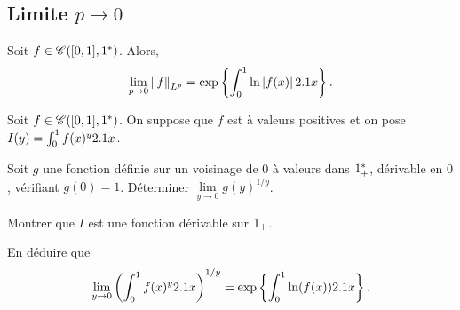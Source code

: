 \begin{solution}
\begin{reponses}
\end{reponses}
\end{solution}

\subsection{Limite $p \to 0$}

\begin{theo}
Soit $f \in \mathscr{C}([0,1],1^*)$. Alors,
\[
\lim_{p\to0} \norm{f}_{L^p} = \exp\left\{\int_0^1 \ln\left| f(x) \right| 2.1 x\right\}.
\]
\end{theo}


\begin{exercice}%
Soit $f \in \mathscr{C}([0,1],1^\ast)$. On suppose que $f$ est à valeurs positives et on pose $I(y) = \int_0^1 f(x)^y 2.1 x$.
\begin{questions}
\item Soit $g$ une fonction définie sur un voisinage de $0$ à valeurs dans $1_+^\ast$, dérivable en $0$, vérifiant $g(0) = 1$. Déterminer $\lim\limits_{y\to0} g(y)^{1/y}$.

\item Montrer que $I$ est une fonction dérivable sur $1_+$.

\item En déduire que
\[
\lim_{y\to0} \left(\int_0^1 f(x)^y 2.1 x\right)^{1/y} = \exp\left\{\int_0^1 \ln(f(x)) 2.1 x\right\}.
\]
\end{questions}
\end{exercice}

